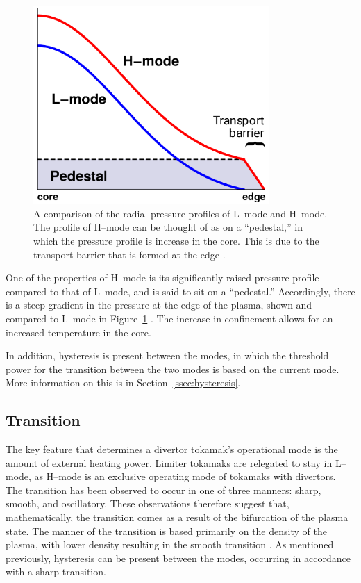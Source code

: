 \begin{figure}[tb] %
\begin{minipage}{0.49\linewidth}
	\centering
	\includegraphics[width=0.8\textwidth]{../Graphics/L-mode_H-mode_compare.png}
\end{minipage}
\hfill
\begin{minipage}{0.49\linewidth}
	\caption{A comparison of the radial pressure profiles of L--mode and H--mode.
	The profile of H--mode can be thought of as on a ``pedestal,'' in which the pressure profile is increase in the core.
	This is due to the transport barrier that is formed at the edge \cite{weymiens_bifurcation_2014}.}
	\label{fig:L-mode_H-mode_compare}
\end{minipage}
\end{figure}

One of the properties of H--mode is its significantly-raised pressure profile compared to that of L--mode, and is said to sit on a ``pedestal.''
Accordingly, there is a steep gradient in the pressure at the edge of the plasma, shown and compared to L--mode in Figure~\ref{fig:L-mode_H-mode_compare} \cite{weymiens_bifurcation_2014}.
The increase in confinement allows for an increased temperature in the core.

In addition, hysteresis is present between the modes, in which the threshold power for the transition between the two modes is based on the current mode.
More information on this is in Section~\ref{ssec:hysteresis}.

\subsection{Transition}\label{ssec:transition}
The key feature that determines a divertor tokamak's operational mode is the amount of external heating power.
Limiter tokamaks are relegated to stay in L--mode, as H--mode is an exclusive operating mode of tokamaks with divertors.
The transition has been observed to occur in one of three manners: sharp, smooth, and oscillatory.
These observations therefore suggest that, mathematically, the transition comes as a result of the bifurcation of the plasma state.
The manner of the transition is based primarily on the density of the plasma, with lower density resulting in the smooth transition \cite{sauter_l--_2012}.
As mentioned previously, hysteresis can be present between the modes, occurring in accordance with a sharp transition.


